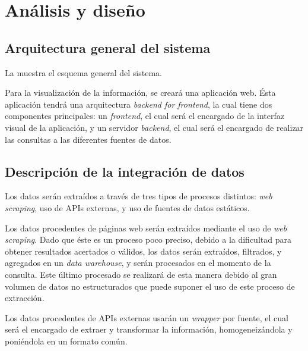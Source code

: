\section{Análisis y diseño}

\subsection{Arquitectura general del sistema}
La  muestra el esquema general del sistema.


Para la visualización de la información, se creará una aplicación web. Ésta aplicación tendrá una arquitectura \textit{backend for frontend}, la cual tiene dos componentes principales: un \textit{frontend}, el cual será el encargado de la interfaz visual de la aplicación, y un servidor \textit{backend}, el cual será el encargado de realizar las consultas a las diferentes fuentes de datos.



\subsection{Descripción de la integración de datos}
Los datos serán extraídos a través de tres tipos de procesos distintos: \textit{web scraping}, uso de APIs externas, y uso de fuentes de datos estáticos.

Los datos procedentes de páginas web serán extraídos mediante el uso de \textit{web scraping}. Dado que éste es un proceso poco preciso, debido a la dificultad para obtener resultados acertados o válidos, los datos serán extraídos, filtrados, y agregados en un \textit{data warehouse}, y serán procesados en el momento de la consulta. Este último procesado se realizará de esta manera debido al gran volumen de datos no estructurados que puede suponer el uso de este proceso de extracción.

Los datos procedentes de APIs externas usarán un \textit{wrapper} por fuente, el cual será el encargado de extraer y transformar la información, homogeneizándola y poniéndola en un formato común.

